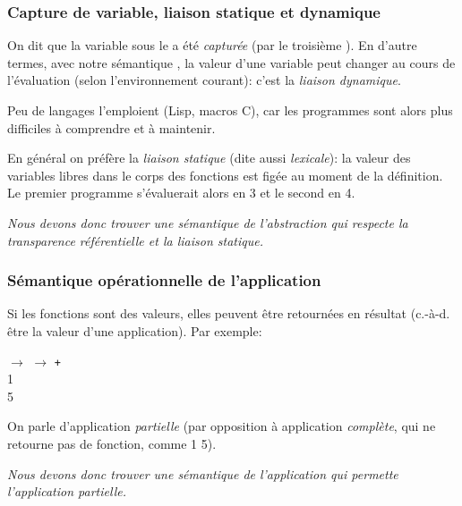 %
\begin{frame}
\frametitle{Capture de variable, liaison statique et dynamique}

On dit que la variable  sous le {\small \Xfun} a été
\emph{capturée} (par le troisième {\small \Xlet}). En d'autre termes,
avec notre sémantique , la valeur d'une variable
peut changer au cours de l'évaluation (selon l'environnement courant):
c'est la \emph{liaison dynamique}.

\bigskip

Peu de langages l'emploient (Lisp, macros C), car les programmes sont
alors plus difficiles à comprendre et à maintenir.

\bigskip

En général on préfère la \emph{liaison statique} (dite aussi
\emph{lexicale}): la valeur des variables libres dans le corps des
fonctions est figée au moment de la définition. Le premier programme
s'évaluerait alors en 3 et le second en 4.

\bigskip

\emph{Nous devons donc trouver une sémantique de l'abstraction qui
respecte la transparence référentielle et la liaison statique.}

\end{frame}

%
\begin{frame}
\frametitle{Sémantique opérationnelle de l'application}

Si les fonctions sont des valeurs, elles peuvent être retournées en
résultat (c.-à-d. être la valeur d'une application). Par exemple:
{\small
 \begin{tabbing}
 \Xlet {} \equal \Xfun {} \(\rightarrow\) \Xfun
  \(\rightarrow\)  \texttt{+}  \Xin\\
 \quad \Xlet {} \equal {} \lpar\num{1}\rpar
 \quad {}\\
 \Xin {} \lpar\num{5}\rpar
 \end{tabbing}
}

On parle d'application \emph{partielle} (par opposition à application
\emph{complète}, qui ne retourne pas de fonction, comme 
\num{1} \num{5}).

\bigskip

\emph{Nous devons donc trouver une sémantique de l'application qui
permette l'application partielle.}

\end{frame}

